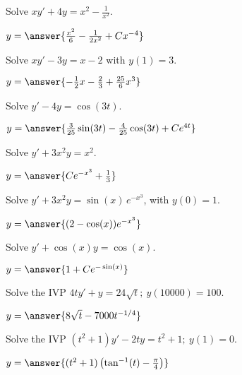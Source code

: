 \documentclass{ximera}
\begin{document}
\begin{exercise}
    Solve $xy' + 4y = x^2 - \frac{1}{x^2}$.
    
    $y = \answer{\frac{x^2}{6} - \frac{1}{2x^2} + Cx^{-4}}$
\end{exercise}

\begin{exercise}
    Solve $xy' - 3y = x-2$ with $y(1) = 3$. 
    
    $y = \answer{-\frac{1}{2}x - \frac{2}{3} + \frac{25}{6}x^3}$
\end{exercise}

\begin{exercise}
    Solve $y' - 4y = \cos{(3t)}$.
    
    $y = \answer{\frac{3}{25}\sin(3t) - \frac{4}{25}\cos(3t) + Ce^{4t}}$
\end{exercise}

\begin{exercise}%
    Solve $y'+3 x^2 y = x^2$.
    
    $y = \answer{C e^{-x^3} + \frac{1}{3}}$
\end{exercise}

\begin{exercise}
    Solve $y' + 3x^2y = \sin(x) \, e^{-x^3}$, with $y(0) = 1$.
    
    $y = \answer{(2-\cos(x))e^{-x^3}}$
\end{exercise}

\begin{exercise}
    Solve $y' + \cos (x) y = \cos(x)$.
    
    $y = \answer{1 + Ce^{-\sin(x)}}$
\end{exercise}

\begin{exercise}
    Solve the IVP $4ty'+y=24\sqrt{t};\ y(10000)=100.$ %
    
    $y = \answer{8\sqrt{t} - 7000t^{-1/4}}$
\end{exercise}

\begin{exercise}
    Solve the IVP $(t^2+1)y' - 2ty = t^2+1; \ y(1)=0$. %
    
    $y = \answer{(t^2 + 1)\left(\tan^{-1}(t) - \frac{\pi}{4}\right)}$
\end{exercise}
\end{document}

